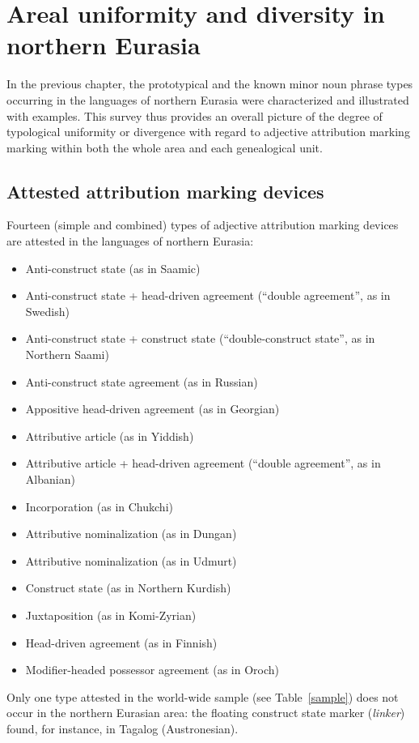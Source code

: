 
\chapter[Areal uniformity and diversity]{Areal uniformity and diversity in northern Eurasia}\label{areality}
In the previous chapter, the prototypical and the known minor noun phrase types occurring in the languages of northern Eurasia were characterized and illustrated with examples. This survey thus provides an overall picture of the degree of typological uniformity or divergence with regard to adjective attribution marking marking within both the whole area and each genealogical unit.

\section{Attested attribution marking devices}
Fourteen (simple and combined) types of adjective attribution marking devices are attested in the languages of northern Eurasia:
\begin{itemize}
\item Anti-construct state (as in Saamic)
\item Anti-construct state + head-driven agreement (“double agreement”, as in Swedish)
\item Anti-construct state + construct state (“double-construct state”, as in Northern Saami)
\item Anti-construct state agreement (as in Russian)
\item Appositive head-driven agreement (as in Georgian)
\item Attributive article (as in Yiddish)
\item Attributive article + head-driven agreement (“double agreement”, as in Albanian)
\item Incorporation (as in Chukchi)
\item Attributive nominalization (as in Dungan)
\item Attributive nominalization (as in Udmurt)
\item Construct state (as in Northern Kurdish)
\item Juxtaposition (as in Komi-Zyrian)
\item Head-driven agreement (as in Finnish)
\item Modifier-headed possessor agreement (as in Oroch)
\end{itemize}
Only one type attested in the world-wide sample (see Table~\ref{sample}) does not occur in the northern Eurasian area: the floating construct state marker (\textit{linker}) found, for instance, in Tagalog (Austronesian). 

